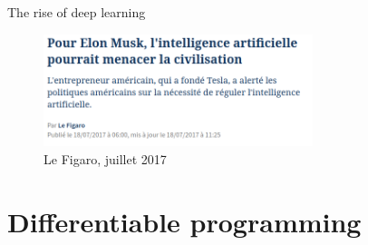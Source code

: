 \documentclass[xcolor=pdftex,dvipsnames,table,mathserif]{beamer}
\begin{document}
\begin{frame}{The rise of deep learning}


\begin{figure}[ht]
  \centering
  \includegraphics[width=0.7\textwidth]{le_figaro_musk}
  \caption*{Le Figaro, juillet 2017}
\end{figure}



\end{frame}


\section{Differentiable programming}
\end{document}
